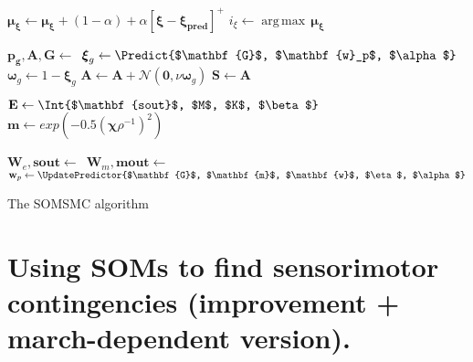 \documentclass[a4paper]{article}
\DeclareMathOperator*{\argmax}{\operatorname*{arg\,max}} %
\begin{document}
\begin{algorithm}[H]
{{        
        $\boldsymbol{\mu_{\xi}}\leftarrow\boldsymbol{\mu_{\xi}} + \left(1-\alpha\right) + \alpha\left[\boldsymbol{\xi} - \boldsymbol{\xi_{pred}}\right]^{+}$\;
        $i_{\xi} \leftarrow \argmax\,\boldsymbol{\mu_{\xi}}$\;
                
        \BlankLine
         
    	$\mathbf{p_g}, \mathbf{A},\mathbf{G}\leftarrow$\,\;  
        $\boldsymbol{\xi}_{g}\leftarrow\Predict{$\mathbf{G}$, $\mathbf{w}_p$, $\alpha$}$\;
        $\boldsymbol{\omega}_{g}\leftarrow 1 - \boldsymbol{\xi}_{g}$\;
        $\mathbf{A}\leftarrow\mathbf{A} + \mathcal{N}(\mathbf{0}, \nu\boldsymbol{\omega}_{g})$\; 
        $\mathbf{S}\leftarrow\mathbf{A}$\;
        
        \BlankLine
             

                
        \BlankLine
          
        $\mathbf{E}\leftarrow\Int{$\mathbf{sout}$, $M$, $K$, $\beta$}$\;
		$\mathbf{m} \leftarrow exp(-0.5(\boldsymbol{\chi}\rho^{-1})^2)$\;
                   
        \BlankLine
        
        $\mathbf{W}_e,\mathbf{sout}\leftarrow$\,\;
        $\mathbf{W}_m,\mathbf{mout}\leftarrow$\,\;       
        $\mathbf{w}_p\leftarrow\UpdatePredictor{$\mathbf{G}$, $\mathbf{m}$, $\mathbf{w}$, $\eta$, $\alpha$}$\;
                            
        \BlankLine
          
    }
}
\caption{The SOMSMC algorithm}\label{smc2}
\end{algorithm}
\DecMargin{1em}

\pagebreak
\section*{Using SOMs to find sensorimotor contingencies (improvement + march-dependent version).}
\end{document}

